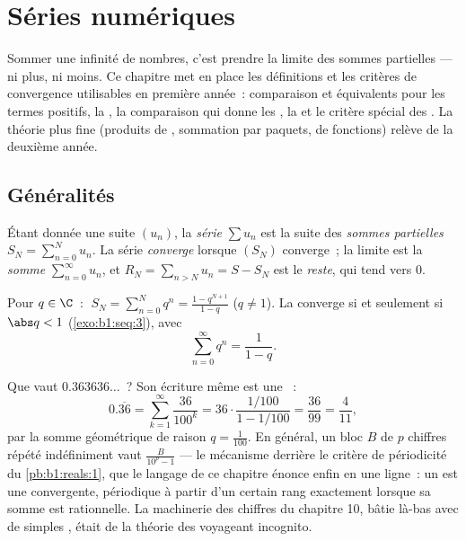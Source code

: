 \chapter{Séries numériques}\label{ch:b1:series}

Sommer une infinité de nombres, c'est prendre la limite des sommes
partielles --- ni plus, ni moins. Ce chapitre met en place les
définitions et les critères de convergence utilisables en première
année~: comparaison et équivalents pour les termes positifs, la , la comparaison  qui donne les , la  et le critère spécial des . La théorie plus fine (produits de , sommation par
paquets,  de fonctions) relève de la deuxième année.

\section{Généralités}

\begin{definition}\label{def:b1:series:def}
Étant donnée une suite $(u_n)$, la \emph{série} $\sum u_n$
est la suite des \emph{sommes partielles} $S_N = \sum_{n=0}^{N} u_n$.
La série \emph{converge} lorsque $(S_N)$ converge~; la limite est la
\emph{somme} $\sum_{n=0}^{\infty} u_n$, et $R_N = \sum_{n > N} u_n =
S - S_N$ est le \emph{reste}, qui tend vers $0$.
\end{definition}

\begin{example}\label{ex:b1:series:geometric}
Pour $q \in \C$~: $\;S_N = \sum_{n=0}^{N} q^n = \frac{1 -
q^{N+1}}{1-q}$ ($q \neq 1$). La  converge si et seulement si
$\abs q < 1$ (\cref{exo:b1:seq:3}), avec
\[
\sum_{n=0}^{\infty} q^n = \frac{1}{1 - q} .
\]
\end{example}

\begin{example}\label{ex:b1:series:periodicdecimal}
Que vaut $0.363636\dots$~? Son écriture même est une ~:
\[
0.\overline{36} = \sum_{k=1}^{\infty} \frac{36}{100^k}
= 36\cdot\frac{1/100}{1 - 1/100} = \frac{36}{99} =
\frac{4}{11} ,
\]
par la somme géométrique de raison $q = \frac{1}{100}$. En général,
un bloc $B$ de $p$ chiffres répété indéfiniment vaut
$\frac{B}{10^p - 1}$ --- le mécanisme derrière le critère de
périodicité du \cref{pb:b1:reals:1}, que le langage de ce chapitre
énonce enfin en une ligne~: un  est une 
convergente, périodique à partir d'un certain rang exactement
lorsque sa somme est rationnelle. La machinerie des chiffres du
chapitre 10, bâtie là-bas avec de simples , était
de la théorie des  voyageant incognito.
\end{example}

